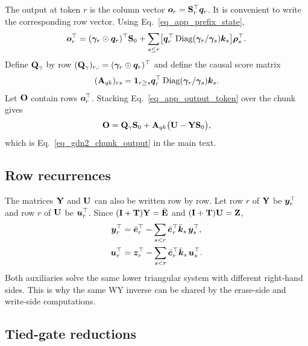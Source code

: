 The output at token $r$ is the column vector ${\bm{o}}_r={\mathbf{S}}_r^\top{\bm{q}}_r$. It is convenient to write the corresponding row vector. Using Eq.~\ref{eq_app_prefix_state},
\begin{align}
    {\bm{o}}_r^\top
    =
    (\boldsymbol{\gamma}_r\odot{\bm{q}}_r)^\top{\mathbf{S}}_0
    +
    \sum_{s\le r}
    \bigl[
    {\bm{q}}_r^\top
    \operatorname{Diag}(\boldsymbol{\gamma}_r/\boldsymbol{\gamma}_s)
    {\bm{k}}_s
    \bigr]
    \boldsymbol{\rho}_s^\top .
\label{eq_app_output_token}
\end{align}
Define ${\mathbf{Q}}_{\gamma}$ by row $({\mathbf{Q}}_{\gamma})_{r,:}=(\boldsymbol{\gamma}_r\odot{\bm{q}}_r)^\top$ and define the causal score matrix
\begin{align}
    ({\mathbf{A}}_{qk})_{rs}
    =
    \mathbf{1}_{r\ge s}
    {\bm{q}}_r^\top
    \operatorname{Diag}(\boldsymbol{\gamma}_r/\boldsymbol{\gamma}_s)
    {\bm{k}}_s .
\label{eq_app_aqk}
\end{align}
Let ${\mathbf{O}}$ contain rows ${\bm{o}}_r^\top$. Stacking Eq.~\ref{eq_app_output_token} over the chunk gives
\begin{align}
    {\mathbf{O}}
    =
    {\mathbf{Q}}_{\gamma}{\mathbf{S}}_0
    +
    {\mathbf{A}}_{qk}
    \bigl({\mathbf{U}}-{\mathbf{Y}}{\mathbf{S}}_0\bigr),
\label{eq_app_chunk_output}
\end{align}
which is Eq.~\ref{eq_gdn2_chunk_output} in the main text.

\subsection{Row recurrences}
\label{app_row_recurrences}

The matrices ${\mathbf{Y}}$ and ${\mathbf{U}}$ can also be written row by row. Let row $r$ of ${\mathbf{Y}}$ be ${\bm{y}}_r^\top$ and row $r$ of ${\mathbf{U}}$ be ${\bm{u}}_r^\top$. Since $({\mathbf{I}}+{\mathbf{T}}){\mathbf{Y}}=\bar{{\mathbf{E}}}$ and $({\mathbf{I}}+{\mathbf{T}}){\mathbf{U}}={\mathbf{Z}}$,
\begin{align}
    {\bm{y}}_r^\top
    &=
    \bar{{\bm{e}}}_r^\top
    -
    \sum_{s<r}
    \bar{{\bm{e}}}_r^\top\bar{{\bm{k}}}_s \, {\bm{y}}_s^\top,
\label{eq_app_y_row}\\
    {\bm{u}}_r^\top
    &=
    {\bm{z}}_r^\top
    -
    \sum_{s<r}
    \bar{{\bm{e}}}_r^\top\bar{{\bm{k}}}_s \, {\bm{u}}_s^\top .
\label{eq_app_u_row}
\end{align}
Both auxiliaries solve the same lower triangular system with different right-hand sides. This is why the same WY inverse can be shared by the erase-side and write-side computations.

\subsection{Tied-gate reductions}
\label{app_reductions}

